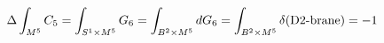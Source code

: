 \begin{equation}
\Delta \int_{M^5} C_5=\int_{S^1\times M^5} G_6=\int_{B^2\times M^5} dG_6=\int_{B^2\times M^5} \delta(\textup{D2-brane})=-1
\end{equation}

